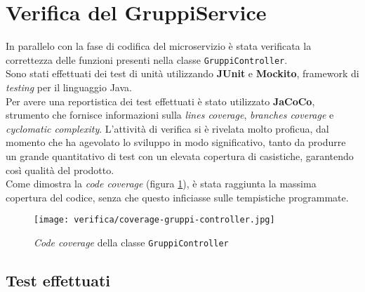 \section{Verifica del GruppiService}
In parallelo con la fase di codifica del \gls{microservizio}
 è stata verificata la correttezza delle funzioni
presenti nella classe \texttt{GruppiController}. \\
Sono stati effettuati dei test di unità utilizzando \textbf{JUnit} e
\textbf{Mockito}, \gls{framework} di \textit{testing} per il linguaggio Java.\\
Per avere una reportistica dei test effettuati è stato utilizzato
\textbf{JaCoCo}, strumento che fornisce informazioni sulla \textit{lines
      coverage}, \textit{branches coverage} e \textit{cyclomatic complexity}.
L'attività di verifica si è rivelata molto proficua, dal momento che ha agevolato lo sviluppo in
modo significativo, tanto da produrre un grande quantitativo di test
con un elevata copertura di casistiche, garantendo così qualità del prodotto.\\
Come dimostra la \textit{code coverage} (figura \ref{img:code-coverage}), è
stata raggiunta la massima copertura del codice, senza che questo inficiasse
sulle tempistiche programmate.

\begin{figure}[H]

      \centerline{\texttt{[image: verifica/coverage-gruppi-controller.jpg]}}

      \caption{\textit{Code coverage} della classe \texttt{GruppiController}}
      \label{img:code-coverage}
\end{figure}

\subsection{Test effettuati}



